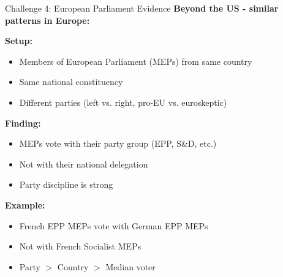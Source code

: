 \documentclass[10pt]{beamer}
\begin{document}
\begin{frame}{Challenge 4: European Parliament Evidence}
\textbf{Beyond the US - similar patterns in Europe:}



\textbf{Setup:}
\begin{itemize}
\item Members of European Parliament (MEPs) from same country
\item Same national constituency
\item Different parties (left vs. right, pro-EU vs. euroskeptic)
\end{itemize}



\textbf{Finding:}
\begin{itemize}
\item MEPs vote with their \alert{party group} (EPP, S\&D, etc.)
\item Not with their national delegation
\item Party discipline is strong
\end{itemize}



\textbf{Example:}
\begin{itemize}
\item French EPP MEPs vote with German EPP MEPs
\item Not with French Socialist MEPs
\item \alert{Party $>$ Country $>$ Median voter}
\end{itemize}
\end{frame}
\end{document}
